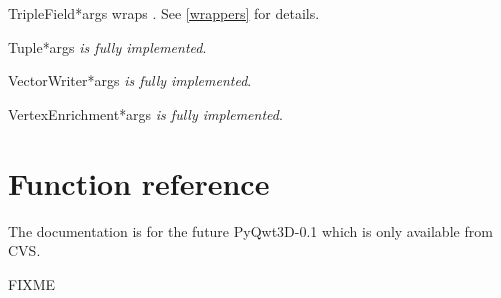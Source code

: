 \documentclass{manual}
\newcommand{\Future}{
  \begin{notice}[warning]
    The documentation is for the future PyQwt3D-0.1 which is only available
    from CVS.
  \end{notice}
}
\begin{document}
\begin{classdesc}{TripleField}{*args}
wraps . See \ref{wrappers} for details.
\end{classdesc}

\begin{classdesc}{Tuple}{*args}
\emph{is fully implemented}.
\end{classdesc}

\begin{classdesc}{VectorWriter}{*args}
\emph{is fully implemented}.
\end{classdesc}

\begin{classdesc}{VertexEnrichment}{*args}
\emph{is fully implemented}.
\end{classdesc}

\section{Function reference}

\Future{}

FIXME

\renewcommand{\indexname}{Index}

\end{document}
